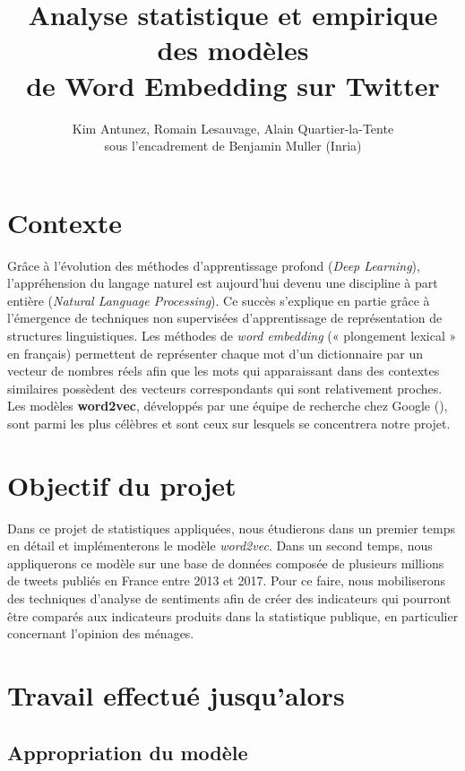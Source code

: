 \documentclass[11pt,french,french]{article}
\title{Analyse statistique et empirique des modèles\\
de Word Embedding sur Twitter}
\author{Kim Antunez, Romain Lesauvage, Alain Quartier-la-Tente\\
sous l'encadrement de Benjamin Muller (Inria)}
\date{}
\begin{document}
\maketitle


\section{Contexte}\label{contexte}

Grâce à l'évolution des méthodes d'apprentissage profond (\emph{Deep
Learning}), l'appréhension du langage naturel est aujourd'hui devenu une
discipline à part entière (\emph{Natural Language Processing}). Ce
succès s'explique en partie grâce à l'émergence de techniques non
supervisées d'apprentissage de représentation de structures
linguistiques. Les méthodes de \emph{word embedding} (« plongement
lexical » en français) permettent de représenter chaque mot d'un
dictionnaire par un vecteur de nombres réels afin que les mots qui
apparaissant dans des contextes similaires possèdent des vecteurs
correspondants qui sont relativement proches. Les modèles
\textbf{word2vec}, développés par une équipe de recherche chez Google
(\cite{Mikolov}), sont parmi les plus célèbres et sont ceux sur lesquels
se concentrera notre projet.

\section{Objectif du projet}\label{objectif-du-projet}

Dans ce projet de statistiques appliquées, nous étudierons dans un
premier temps en détail et implémenterons le modèle \emph{word2vec}.
Dans un second temps, nous appliquerons ce modèle sur une base de
données composée de plusieurs millions de tweets publiés en France entre
2013 et 2017. Pour ce faire, nous mobiliserons des techniques d'analyse
de sentiments afin de créer des indicateurs qui pourront être comparés
aux indicateurs produits dans la statistique publique, en particulier
concernant l'opinion des ménages.

\section{Travail effectué
jusqu'alors}\label{travail-effectuuxe9-jusqualors}

\subsection{Appropriation du modèle}\label{appropriation-du-moduxe8le}
\end{document}
